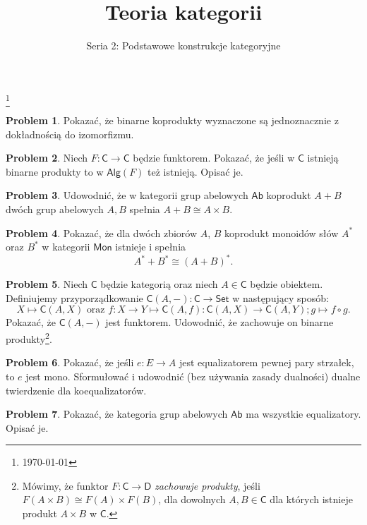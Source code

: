 \documentclass[10pt]{amsart}
\title{Teoria kategorii}
\author{Seria 2: Podstawowe konstrukcje kategoryjne}
\theoremstyle{plain}
\theoremstyle{definition}
\newtheorem{problem}{Problem}
\numberwithin{equation}{section}
\newcommand\blfootnote[1]{%
  \begingroup
  \renewcommand\thefootnote{}\footnote{#1}%
  \addtocounter{footnote}{-1}%
  \endgroup
}
\begin{document}
\maketitle

\blfootnote{\today}



\begin{problem}
Pokazać, że binarne koprodukty wyznaczone są jednoznacznie z dokładnością do izomorfizmu.
\end{problem}

\begin{problem}
Niech $F:\mathsf{C}\to \mathsf{C}$ będzie funktorem. Pokazać, że jeśli w $\mathsf{C}$ istnieją binarne produkty to  w $\mathsf{Alg}(F)$ też istnieją. Opisać je. 
\end{problem}

\begin{problem}
Udowodnić, że w kategorii grup abelowych $\mathsf{Ab}$ koprodukt $A+B$ dwóch grup abelowych $A,B$ spełnia $A+B \cong A\times B$.  
\end{problem}

\begin{problem}
Pokazać, że dla dwóch zbiorów $A$, $B$ koprodukt monoidów słów $A^\ast$ oraz $B^\ast$ w kategorii $\mathsf{Mon}$ istnieje i spełnia 
$$
A^\ast + B^\ast \cong (A+B)^\ast.
$$
\end{problem}


\begin{problem}
Niech $\mathsf{C}$ będzie kategorią oraz niech $A\in \mathsf{C}$ będzie obiektem. Definiujemy przyporządkowanie $\mathsf{C}(A,-):\mathsf{C}\to \mathsf{Set}$ w następujący sposób:
$$
X\mapsto \mathsf{C}(A,X) \text{ oraz } f:X\to Y \mapsto \mathsf{C}(A,f):\mathsf{C}(A,X)\to \mathsf{C}(A,Y);g\mapsto f\circ g. 
$$
Pokazać, że $\mathsf{C}(A,-)$ jest funktorem. Udowodnić, że zachowuje on binarne produkty\footnote{Mówimy, że funktor $F:\mathsf{C}\to\mathsf{D}$ \emph{zachowuje produkty}, jeśli $F(A\times B) \cong F(A)\times F(B)$, dla dowolnych $A,B\in \mathsf{C}$ dla których istnieje produkt $A\times B$ w $\mathsf{C}$.}. 
\end{problem}


\begin{problem}
Pokazać, że jeśli $e:E\to A$ jest equalizatorem pewnej pary strzałek, to $e$ jest mono. Sformułować i udowodnić (bez używania zasady dualności) dualne twierdzenie dla koequalizatorów. 
\end{problem}

\begin{problem}
Pokazać, że kategoria grup abelowych $\mathsf{Ab}$ ma wszystkie equalizatory. Opisać je.  
\end{problem}
\end{document}
